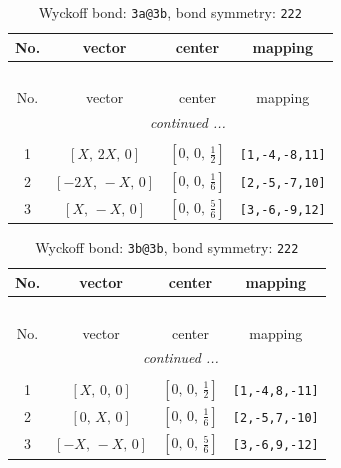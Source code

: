 \documentclass[fleqn,8pt]{jsarticle}
\begin{document}
\renewcommand{\arraystretch}{1.2}
\begin{longtable}{cccc}
\caption{Wyckoff bond: {\tt 3a@3b}, bond symmetry: {\tt 222}}
 \\
 \hline \hline
No. & vector & center & mapping \\ \hline \endfirsthead

\multicolumn{3}{l}{\tablename\ \thetable{}} \\
 \hline \hline
No. & vector & center & mapping \\ \hline \endhead

 \hline \hline
\multicolumn{3}{r}{\footnotesize\it continued ...} \\ \endfoot

 \hline \hline
\multicolumn{3}{r}{} \\ \endlastfoot

1 & $\left[ X,\, 2 X,\, 0 \right]$ & $\left[ 0,\, 0,\, \frac{1}{2} \right]$ & {\tt [1,-4,-8,11]} \\ \hline
2 & $\left[ - 2 X,\, - X,\, 0 \right]$ & $\left[ 0,\, 0,\, \frac{1}{6} \right]$ & {\tt [2,-5,-7,10]} \\ \hline
3 & $\left[ X,\, - X,\, 0 \right]$ & $\left[ 0,\, 0,\, \frac{5}{6} \right]$ & {\tt [3,-6,-9,12]} \\
\end{longtable}
\renewcommand{\arraystretch}{1.2}
\begin{longtable}{cccc}
\caption{Wyckoff bond: {\tt 3b@3b}, bond symmetry: {\tt 222}}
 \\
 \hline \hline
No. & vector & center & mapping \\ \hline \endfirsthead

\multicolumn{3}{l}{\tablename\ \thetable{}} \\
 \hline \hline
No. & vector & center & mapping \\ \hline \endhead

 \hline \hline
\multicolumn{3}{r}{\footnotesize\it continued ...} \\ \endfoot

 \hline \hline
\multicolumn{3}{r}{} \\ \endlastfoot

1 & $\left[ X,\, 0,\, 0 \right]$ & $\left[ 0,\, 0,\, \frac{1}{2} \right]$ & {\tt [1,-4,8,-11]} \\ \hline
2 & $\left[ 0,\, X,\, 0 \right]$ & $\left[ 0,\, 0,\, \frac{1}{6} \right]$ & {\tt [2,-5,7,-10]} \\ \hline
3 & $\left[ - X,\, - X,\, 0 \right]$ & $\left[ 0,\, 0,\, \frac{5}{6} \right]$ & {\tt [3,-6,9,-12]} \\
\end{longtable}
\end{document}
